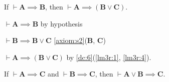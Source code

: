 \documentclass{amsart}%
\newcommand\metavariable[1]{\boldsymbol{#1}}
\begin{document}
\begin{lemma}\label{lem:prop:weakening-r}
If $\vdash\metavariable{A}\implies\metavariable{B}$, then $\vdash\metavariable{A}\implies(\metavariable{B}\lor\metavariable{C})$.
\end{lemma}

\begin{pf}
\item\label{lm3r:1} $\vdash\metavariable{A}\implies\metavariable{B}$ by hypothesis
\item\label{lm3r:4} $\vdash\metavariable{B}\implies\metavariable{B}\lor\metavariable{C}$
  \ref{axiom:s2}($\metavariable{B}$, $\metavariable{C}$)
\item $\vdash\metavariable{A}\implies(\metavariable{B}\lor\metavariable{C})$
  by \ref{dc:6}(\ref{lm3r:1}, \ref{lm3r:4}).
\end{pf}

\begin{lemma}\label{lm:prop:weaken-premises}
If $\vdash\metavariable{A}\implies\metavariable{C}$
and $\vdash\metavariable{B}\implies\metavariable{C}$,
then $\vdash\metavariable{A}\lor\metavariable{B}\implies\metavariable{C}$.
\end{lemma}
\end{document}

